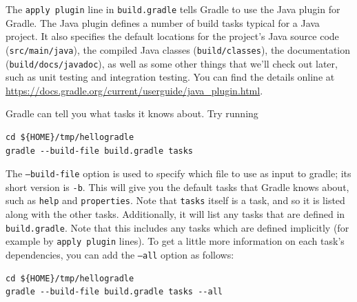 \documentclass[12pt, a4paper, twoside,openany,titlepage]{article}
\begin{document}
The \texttt{apply plugin} line in \texttt{build.gradle} tells Gradle to use the Java plugin for Gradle. The Java plugin defines a number of build tasks typical for a Java project. It also specifies the default locations for the project's Java source code (\texttt{src/main/java}), the compiled Java classes (\texttt{build/classes}), the documentation (\texttt{build/docs/javadoc}), as well as some other things that we'll check out later, such as unit testing and integration testing. You can find the details online at \url{https://docs.gradle.org/current/userguide/java_plugin.html}.

Gradle can tell you what tasks it knows about. Try running
\begin{lstlisting}[style=basic,style=bash]
cd ${HOME}/tmp/hellogradle
gradle --build-file build.gradle tasks
\end{lstlisting} %
The \texttt{--build-file} option is used to specify which file to use as input to gradle; its short version is \texttt{-b}. This will give you the default tasks that Gradle knows about, such as \texttt{help} and \texttt{properties}. Note that \texttt{tasks} itself is a task, and so it is listed along with the other tasks. Additionally, it will list any tasks that are defined in \texttt{build.gradle}. Note that this includes any tasks which are defined implicitly (for example by \texttt{apply plugin} lines). To get a little more information on each task's dependencies, you can add the \texttt{--all} option as follows:
\begin{lstlisting}[style=basic,style=bash]
cd ${HOME}/tmp/hellogradle
gradle --build-file build.gradle tasks --all
\end{lstlisting} %
\end{document}
